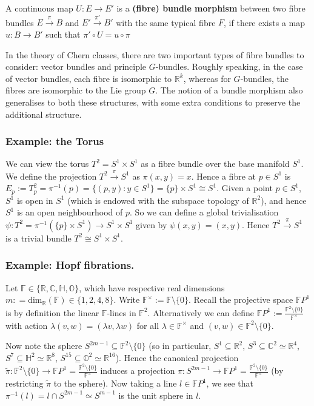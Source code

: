 \documentclass[a4paper]{article}
\theoremstyle{definition} \newtheorem*{definition}{Definition}
\theoremstyle{definition} \newtheorem*{definitions}{Definitions}
\theoremstyle{plain} \newtheorem{theorem}{Theorem}[section]
\theoremstyle{plain} \newtheorem{proposition}[theorem]{Proposition}
\theoremstyle{plain} \newtheorem{corollary}[theorem]{Corollary}
\theoremstyle{plain} \newtheorem{lemma}[theorem]{Lemma}
\theoremstyle{plain} \newtheorem{example}[theorem]{Example}
\newcommand{\defn}[1]{\textbf{#1}}
\newcommand{\realnos}{\mathbb{R}}
\newcommand{\complexnos}{\mathbb{C}}
\begin{document}
A continuous map $U:E\rightarrow E'$ is a \defn{(fibre) bundle morphism} between two fibre bundles $E\xrightarrow{\pi} B$ and $E'\xrightarrow{\pi'} B'$ with the same typical fibre $F$, if there exists a map $u:B\rightarrow B'$ such that $\pi' \circ U = u \circ \pi$

In the theory of Chern classes, there are two important types of fibre bundles to consider: vector bundles and principle $G$-bundles. Roughly speaking, in the case of vector bundles, each fibre is isomorphic to $\realnos^k$, whereas for $G$-bundles, the fibres are isomorphic to the Lie group $G$. The notion of a bundle morphism also generalises to both these structures, with some extra conditions to preserve the additional structure. 

\subsubsection{Example: the Torus}
We can view the torus $T^2=S^1\times S^1$ as a fibre bundle over the base manifold $S^1$. We define the projection $T^2 \xrightarrow{\pi} S^1$ as $\pi(x, y)=x$. Hence a fibre at $p\in S^1$ is $E_p := T^2_p = \pi^{-1}(p) = \{(p, y): y\in S^1\} = \{p\}\times S^1 \cong S^1$. Given a point $p\in S^1$, $S^1$ is open in $S^1$ (which is endowed with the subspace topology of $\realnos^2$), and hence $S^1$ is an open neighbourhood of $p$. So we can define a global trivialisation $\psi:T^2=\pi^{-1}(\{p\}\times S^1)\to S^1 \times S^1$ given by $\psi(x, y)=(x, y)$. Hence $T^2 \xrightarrow{\pi} S^1$ is a trivial bundle $T^2\cong S^1\times S^1$. 

\subsubsection{Example: Hopf fibrations.}

Let $\mathbb{F}\in \{\realnos, \complexnos, \mathbb{H}, \mathbb{O}\}$, which have respective real dimensions $m: = \text{dim}_\realnos (\mathbb{F})\in \{1,2,4,8\}$. Write $\mathbb{F}^\times := \mathbb{F}\setminus \{0\}$. Recall the projective space $\mathbb{F}P^1$ is by definition the linear $\mathbb{F}$-lines in $\mathbb{F}^2$. Alternatively we can define  $\mathbb{F}P^1:=\frac{\mathbb{F}^2 \setminus \{0\}}{\mathbb{F}^\times}$ with action $\lambda (v, w)=(\lambda v, \lambda w)$ for all $\lambda \in \mathbb{F}^\times$ and $(v,w)\in \mathbb{F}^2 \setminus \{0\}$.  

Now note the sphere $S^{2m-1}\subseteq \mathbb{F}^2\setminus \{0\}$ (so in particular, $S^1 \subseteq \realnos^2$, $S^3 \subseteq \complexnos^2 \simeq \realnos^4$, $S^7\subseteq \mathbb{H}^2 \simeq \realnos^8$, $S^{15}\subseteq \mathbb{O}^2\simeq \realnos^{16}$). Hence the canonical projection $\tilde{\pi}:\mathbb{F}^2 \setminus \{0\} \to \mathbb{F}P^1=\frac{\mathbb{F}^2 \setminus \{0\}}{\mathbb{F}^\times}$ induces a projection $\pi:S^{2m-1} \to \mathbb{F}P^1 = \frac{\mathbb{F}^2 \setminus \{0\}}{\mathbb{F}^\times}$ (by restricting $\tilde{\pi}$ to the sphere). 
Now taking a line $l\in \mathbb{F}P^1$, we see that $\pi^{-1}(l) = l \cap S^{2m-1} \simeq S^{m-1}$ is the unit sphere in $l$. 
\end{document}
